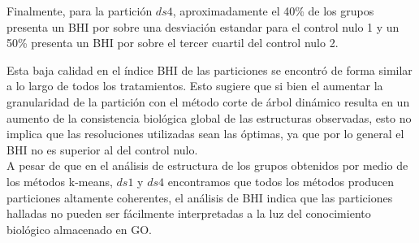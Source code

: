 Finalmente, para la partición $ds4$, aproximadamente el 40\% de los grupos presenta un BHI por sobre una desviación estandar para el control nulo 1 y un 50\% presenta un BHI por sobre el tercer cuartil del control nulo 2. 

Esta baja calidad en el índice BHI de las particiones se encontró de forma similar a lo largo de todos los tratamientos. Esto sugiere que si bien el aumentar la granularidad de la partición con el método corte de árbol dinámico resulta en un aumento de la consistencia biológica global de las estructuras observadas, esto no implica que las resoluciones utilizadas sean las óptimas, ya que por lo general el BHI no es superior al del control nulo.\\
A pesar de que en el análisis de estructura de los grupos obtenidos por medio de los métodos k-means, $ds1$ y $ds4$ encontramos que todos los métodos producen particiones altamente coherentes, el análisis de BHI indica que las particiones halladas no pueden ser fácilmente interpretadas a la luz del conocimiento biológico almacenado en GO.